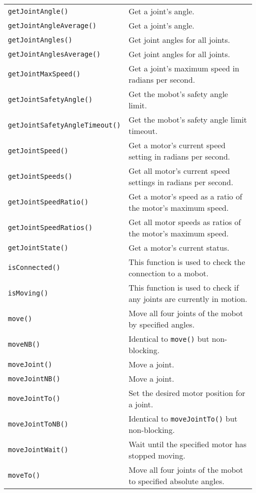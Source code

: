 \begin{table}[!h]
\begin{center}
\begin{tabular}{p{48 mm}p{110 mm}}
\texttt{getJointAngle()} & Get a joint's angle. \\
\texttt{getJointAngleAverage()} & Get a joint's angle. \\
\texttt{getJointAngles()} & Get joint angles for all joints. \\
\texttt{getJointAnglesAverage()} & Get joint angles for all joints. \\
\texttt{getJointMaxSpeed()} & Get a joint's maximum speed in radians per second. \\
\texttt{getJointSafetyAngle()} & Get the mobot's safety angle limit. \\
\texttt{getJointSafetyAngleTimeout()} & Get the mobot's safety angle limit timeout. \\
\texttt{getJointSpeed()} & Get a motor's current speed setting in radians per second. \\
\texttt{getJointSpeeds()} & Get all motor's current speed settings in radians per second. \\
\texttt{getJointSpeedRatio()} & Get a motor's speed as a ratio of the motor's maximum speed. \\
\texttt{getJointSpeedRatios()} & Get all motor speeds as ratios of the motor's maximum speed. \\
\texttt{getJointState()} & Get a motor's current status. \\
\texttt{isConnected()} & This function is used to check the connection to a mobot. \\
\texttt{isMoving()} & This function is used to check if any joints are currently in motion. \\
\texttt{move()} & Move all four joints of the mobot by specified angles. \\
\texttt{moveNB()} & Identical to \texttt{move()} but non-blocking. \\
\texttt{moveJoint()} & Move a joint. \\
\texttt{moveJointNB()} & Move a joint. \\
\texttt{moveJointTo()} & Set the desired motor position for a joint. \\
\texttt{moveJointToNB()} & Identical to \texttt{moveJointTo()} but non-blocking. \\
\texttt{moveJointWait()} & Wait until the specified motor has stopped moving. \\
\texttt{moveTo()} & Move all four joints of the mobot to specified absolute angles. \\

\end{tabular}
\end{center}
\end{table}
